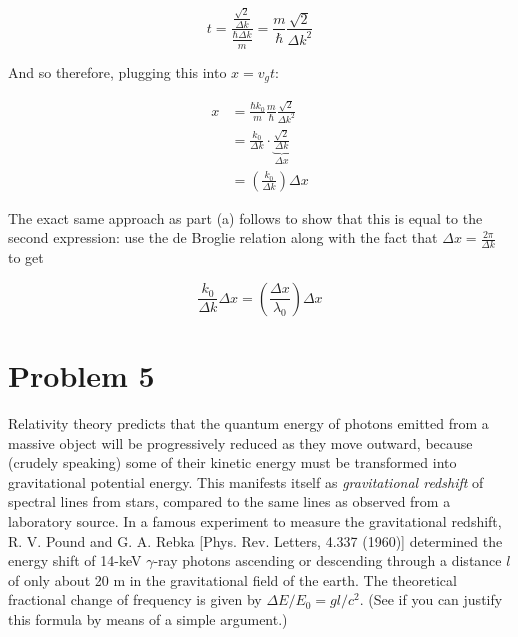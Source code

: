 \documentclass[10pt]{article}
\begin{document}
\begin{enumerate}[(a)]
\begin{solution}
            \[ t = \frac{\frac{\sqrt 2}{\Delta k}}{\frac{\hbar \Delta k}{m}} = \frac{m}{\hbar} \frac{\sqrt{2}}{\Delta k^2}\] 

            And so therefore, plugging this into $x = v_gt$: 

            \begin{align*}
                x &= \frac{\hbar k_0}{m} \frac{m}{\hbar} \frac{\sqrt{2}}{\Delta k^2} \\
                &= \frac{k_0}{\Delta k} \cdot \underbrace{\frac{\sqrt{2}}{\Delta k}}_{\Delta x}\\
                &= \left(\frac{k_0}{\Delta k}\right) \Delta x
            \end{align*}

            The exact same approach as part (a) follows to show that this is equal to the second expression: use the de Broglie relation along with the fact that $\Delta x = \frac{2\pi}{\Delta k}$ to get

            \[ \frac{k_0}{\Delta k}\Delta x = \left( \frac{\Delta x}{\lambda_0}\right) \Delta x\]
        \end{solution}
    \end{enumerate}

    \pagebreak

    \section*{Problem 5}

    Relativity theory predicts that the quantum energy of photons emitted from a massive object will be progressively reduced as they move outward, because (crudely speaking) some of their kinetic energy must be transformed into gravitational potential energy. This manifests itself as \textit{gravitational redshift} of spectral lines from stars, compared to the same lines as observed from a laboratory source. In a famous experiment to measure the gravitational redshift, R. V. Pound and G. A. Rebka [Phys. Rev. Letters, 4.337 (1960)] determined the energy shift of 14-keV $\gamma$-ray photons ascending or descending through a distance $l$ of only about 20 m in the gravitational field of the earth. The theoretical fractional change of frequency is given by $\Delta E/E_0 = gl/c^2$. (See if you can justify this formula by means of a simple argument.)
\end{document}
